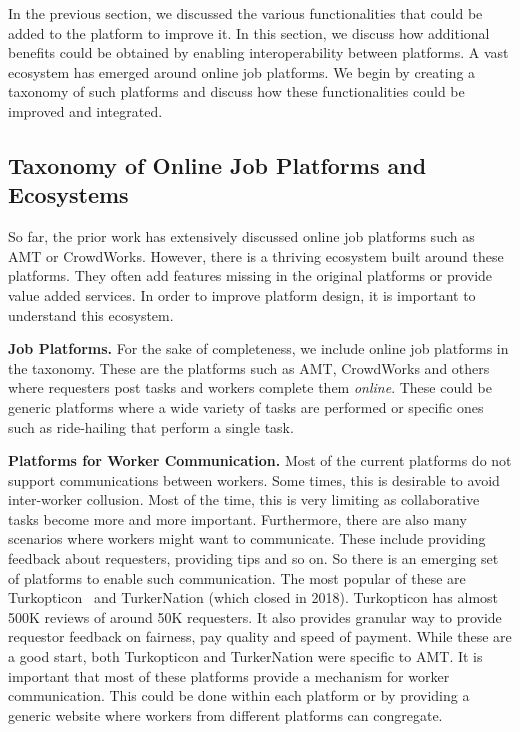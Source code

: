In the previous section, we discussed the various functionalities that could be added to the platform to improve it.
In this section, we discuss how additional benefits could be obtained by enabling interoperability between platforms.
A vast ecosystem has emerged around online job platforms.
We begin by creating a taxonomy of such platforms and discuss how these functionalities could be improved and integrated.


\subsection{Taxonomy of Online Job Platforms and Ecosystems}





So far, the prior work has extensively discussed online job platforms such as AMT or CrowdWorks.
However, there is a thriving ecosystem built around these platforms.
They often add features missing in the original platforms or provide value added services.
In order to improve platform design, it is important to understand this ecosystem.


\textbf{Job Platforms.}
For the sake of completeness, we include online job platforms in the taxonomy.
These are the platforms such as AMT, CrowdWorks and others where requesters post tasks
and workers complete them \emph{online}.
These could be generic platforms where a wide variety of tasks are performed or
specific ones such as ride-hailing that perform a single task.

\textbf{Platforms for Worker Communication.}
Most of the current platforms do not support communications between workers.
Some times, this is desirable to avoid inter-worker collusion.
Most of the time, this is very limiting as collaborative tasks become more and more important.
Furthermore, there are also many scenarios where workers might want to communicate.
These include providing feedback about requesters, providing tips and so on.
So there is an emerging set of platforms to enable such communication.
The most popular of these are Turkopticon~\cite{irani2013turkopticon} and TurkerNation (which closed in 2018).
Turkopticon has almost 500K reviews of around 50K requesters.
It also provides granular way to provide requestor feedback on fairness, pay quality and speed of payment.
While these are a good start, both Turkopticon and TurkerNation were specific to AMT.
It is important that most of these platforms provide a mechanism for worker communication.
This could be done within each platform or by providing a generic website where workers from different platforms can congregate.

